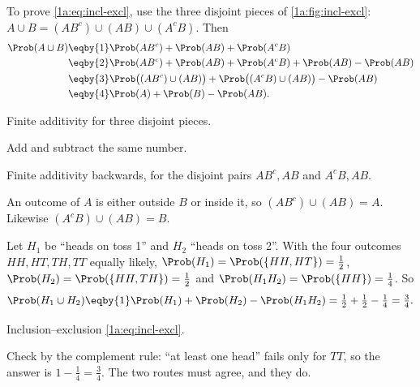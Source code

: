 To prove \eqref{1a:eq:incl-excl}, use the three disjoint pieces of
\cref{1a:fig:incl-excl}: $A\cup B=(AB^c)\cup(AB)\cup(A^cB)$. Then
\begin{align*}
\Prob(A\cup B)
&\eqby{1} \Prob(AB^c)+\Prob(AB)+\Prob(A^cB)\\
&\eqby{2} \Prob(AB^c)+\Prob(AB)+\Prob(A^cB)+\Prob(AB)-\Prob(AB)\\
&\eqby{3} \Prob\bigl((AB^c)\cup(AB)\bigr)+\Prob\bigl((A^cB)\cup(AB)\bigr)-\Prob(AB)\\
&\eqby{4} \Prob(A)+\Prob(B)-\Prob(AB).
\end{align*}
\begin{explain}
  \item Finite additivity for three disjoint pieces.
  \item Add and subtract the same number.
  \item Finite additivity backwards, for the disjoint pairs $AB^c,AB$ and $A^cB,AB$.
  \item An outcome of $A$ is either outside $B$ or inside it, so
        $(AB^c)\cup(AB)=A$. Likewise $(A^cB)\cup(AB)=B$.
\end{explain}

\label{1a:ex:two-heads}
Let $H_1$ be ``heads on toss 1'' and $H_2$ ``heads on toss 2''. With the four
outcomes $HH,HT,TH,TT$ equally likely, $\Prob(H_1)=\Prob(\{HH,HT\})=\tfrac12$,
$\Prob(H_2)=\Prob(\{HH,TH\})=\tfrac12$ and $\Prob(H_1H_2)=\Prob(\{HH\})=\tfrac14$. So
\begin{align*}
\Prob(H_1\cup H_2)\eqby{1}\Prob(H_1)+\Prob(H_2)-\Prob(H_1H_2)
=\tfrac12+\tfrac12-\tfrac14=\tfrac34 .
\end{align*}
\begin{explain}
  \item Inclusion--exclusion \eqref{1a:eq:incl-excl}.
\end{explain}
Check by the complement rule: ``at least one head'' fails only for $TT$, so
the answer is $1-\tfrac14=\tfrac34$. The two routes must agree, and they do.

